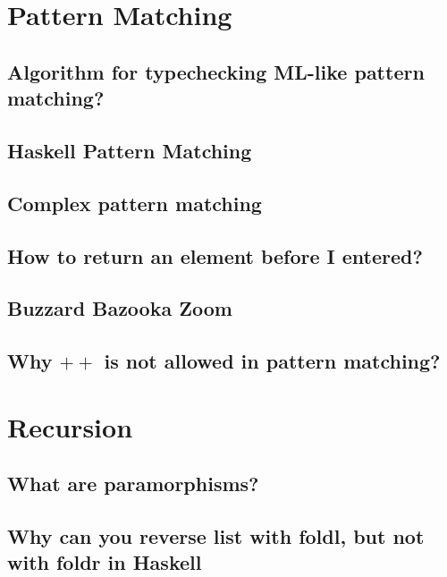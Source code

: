 \documentclass{book}%
\begin{document}
\chapter{Pattern Matching}

\section{Algorithm for typechecking ML-like pattern matching?}


\section{Haskell Pattern Matching}


\section{Complex pattern matching}


\section{How to return an element before I entered?}


\section{Buzzard Bazooka Zoom}


\section{Why $+\!\!+$ is not allowed in pattern matching?}



\chapter{Recursion}

\section{What are paramorphisms?}


\section{Why can you reverse list with foldl, but not with foldr in Haskell}

\end{document}
